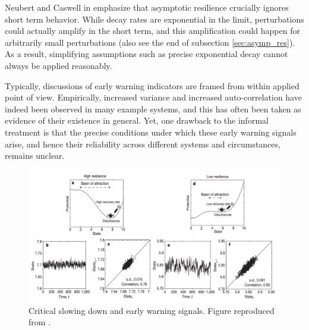 Neubert and Caswell in \cite{neubertAlternativesResilienceMeasuring1997a} emphasize that asymptotic resilience crucially ignores short term behavior. While decay rates are exponential in the limit, perturbations could actually amplify in the short term, and this amplification could happen for arbitrarily small perturbations (also see the end of subsection \ref{sec:asymp_res}). As a result, simplifying assumptions such as precise exponential decay cannot always be applied reasonably. 

Typically, discussions of early warning indicators are framed from within applied point of view. Empirically, increased variance and increased auto-correlation have indeed been observed in many example systems, and this has often been taken as evidence of their existence in general. Yet, one drawback to the informal treatment is that the precise conditions under which these early warning signals arise, and hence their reliability across different systems and circumstances, remains unclear. 





\begin{figure}[ht]
	\centering
	\captionsetup{width=\linewidth}
	\includegraphics[width=\textwidth]{figs/critical_slowing_down}
	\caption{Critical slowing down and early warning signals. Figure reproduced from \cite{schefferEarlywarningSignalsCritical2009a}.}
	
	\label{fig:csd}
\end{figure} 



	
